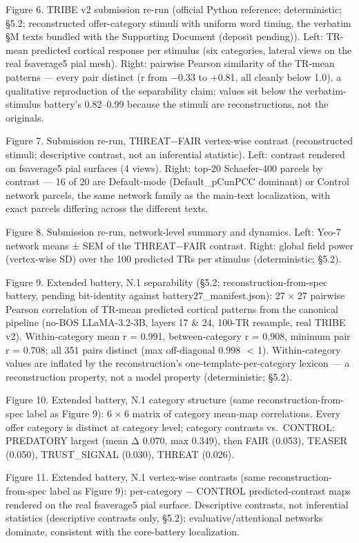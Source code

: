 \documentclass[
]{article}
\begin{document}
Figure 6. TRIBE v2 submission re-run (official Python reference;
deterministic; §5.2; reconstructed offer-category stimuli with uniform
word timing, the verbatim §M texts bundled with the Supporting Document
(deposit pending)). Left: TR-mean predicted cortical response per
stimulus (six categories, lateral views on the real fsaverage5 pial
mesh). Right: pairwise Pearson similarity of the TR-mean patterns ---
every pair distinct ({r} from {−0.33} to {+0.81}, all cleanly below
1.0), a qualitative reproduction of the separability claim; values sit
below the verbatim-stimulus battery's 0.82--0.99 because the stimuli are
reconstructions, not the originals.

Figure 7. Submission re-run, THREAT{−}FAIR vertex-wise contrast
(reconstructed stimuli; descriptive contrast, not an inferential
statistic). Left: contrast rendered on fsaverage5 pial surfaces (4
views). Right: top-20 Schaefer-400 parcels by
{\textbar{}}contrast{\textbar{}} --- 16 of 20 are Default-mode
(Default\_pCunPCC dominant) or Control network parcels, the same network
family as the main-text localization, with exact parcels differing
across the different texts.

Figure 8. Submission re-run, network-level summary and dynamics. Left:
Yeo-7 network means {±} SEM of the THREAT{−}FAIR contrast. Right: global
field power (vertex-wise SD) over the 100 predicted TRs per stimulus
(deterministic; §5.2).

Figure 9. Extended battery, N.1 separability (§5.2;
reconstruction-from-spec battery, pending bit-identity against
battery27\_manifest.json): {27 × 27} pairwise Pearson correlation of
TR-mean predicted cortical patterns from the canonical pipeline (no-BOS
LLaMA-3.2-3B, layers 17 \& 24, 100-TR resample, real TRIBE v2).
Within-category mean {r = 0.991}, between-category {r = 0.908}, minimum
pair {r = 0.708}; all 351 pairs distinct (max off-diagonal 0.998
{ \textless{} 1}). Within-category values are inflated by the
reconstruction's one-template-per-category lexicon --- a reconstruction
property, not a model property (deterministic; §5.2).

Figure 10. Extended battery, N.1 category structure (same
reconstruction-from-spec label as Figure 9): {6 × 6} matrix of category
mean-map correlations. Every offer category is distinct at category
level; category contrasts vs.~CONTROL: PREDATORY largest (mean
{\textbar{}Δ\textbar{}} 0.070, max 0.349), then FAIR (0.053), TEASER
(0.050), TRUST\_SIGNAL (0.030), THREAT (0.026).

Figure 11. Extended battery, N.1 vertex-wise contrasts (same
reconstruction-from-spec label as Figure 9): per-category {−} CONTROL
predicted-contrast maps rendered on the real fsaverage5 pial surface.
Descriptive contrasts, not inferential statistics (descriptive contrasts
only, §5.2); evaluative/attentional networks dominate, consistent with
the core-battery localization.
\end{document}
